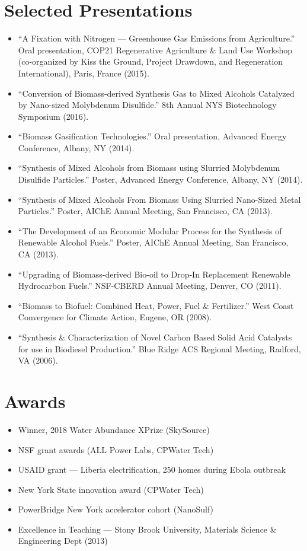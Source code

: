 \documentclass[11pt]{article}
\begin{document}
\section*{Selected Presentations}
\begin{itemize}
\item ``A Fixation with Nitrogen --- Greenhouse Gas Emissions from Agriculture.'' Oral presentation, COP21 Regenerative Agriculture \& Land Use Workshop (co-organized by Kiss the Ground, Project Drawdown, and Regeneration International), Paris, France (2015).
\item ``Conversion of Biomass-derived Synthesis Gas to Mixed Alcohols Catalyzed by Nano-sized Molybdenum Disulfide.'' 8th Annual NYS Biotechnology Symposium (2016).
\item ``Biomass Gasification Technologies.'' Oral presentation, Advanced Energy Conference, Albany, NY (2014).
\item ``Synthesis of Mixed Alcohols from Biomass using Slurried Molybdenum Disulfide Particles.'' Poster, Advanced Energy Conference, Albany, NY (2014).
\item ``Synthesis of Mixed Alcohols From Biomass Using Slurried Nano-Sized Metal Particles.'' Poster, AIChE Annual Meeting, San Francisco, CA (2013).
\item ``The Development of an Economic Modular Process for the Synthesis of Renewable Alcohol Fuels.'' Poster, AIChE Annual Meeting, San Francisco, CA (2013).
\item ``Upgrading of Biomass-derived Bio-oil to Drop-In Replacement Renewable Hydrocarbon Fuels.'' NSF-CBERD Annual Meeting, Denver, CO (2011).
\item ``Biomass to Biofuel: Combined Heat, Power, Fuel \& Fertilizer.'' West Coast Convergence for Climate Action, Eugene, OR (2008).
\item ``Synthesis \& Characterization of Novel Carbon Based Solid Acid Catalysts for use in Biodiesel Production.'' Blue Ridge ACS Regional Meeting, Radford, VA (2006).
\end{itemize}

\section*{Awards}
\begin{itemize}
\item Winner, 2018 Water Abundance XPrize (SkySource)
\item NSF grant awards (ALL Power Labs, CPWater Tech)
\item USAID grant --- Liberia electrification, 250 homes during Ebola outbreak
\item New York State innovation award (CPWater Tech)
\item PowerBridge New York accelerator cohort (NanoSulf)
\item Excellence in Teaching --- Stony Brook University, Materials Science \& Engineering Dept (2013)
\end{itemize}
\end{document}
